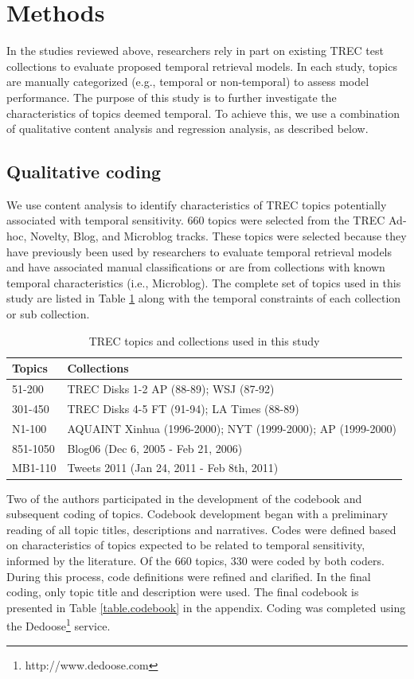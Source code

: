 \documentclass[runningheads,a4paper]{llncs}
\begin{document}
\section{Methods}

In the studies reviewed above, researchers rely in part on existing TREC test collections to evaluate proposed temporal retrieval models. In each study, topics are manually categorized (e.g.,  temporal or non-temporal) to assess model performance. The purpose of this study is to further investigate the characteristics of topics deemed temporal. To achieve this, we use a combination of qualitative content analysis and regression analysis, as described below.

\subsection{Qualitative coding}
We use content analysis \cite{Krippendorff1980} to identify characteristics of TREC topics potentially associated with temporal sensitivity. 660 topics were selected from the TREC Ad-hoc, Novelty, Blog, and Microblog tracks. These topics were selected because they have previously been used by researchers to evaluate temporal retrieval models and have associated manual classifications or are from collections with known temporal characteristics (i.e., Microblog). The complete set of topics used in this study are listed in Table \ref{table.topics} along with the temporal constraints of each collection or sub collection.

\begin{table}
\center
\small
\begin{tabular}{| l | l|} \hline
\bf{Topics} & \bf{Collections}\\ \hline
51-200 & TREC Disks 1-2 AP (88-89); WSJ (87-92) \\ \hline
301-450 &  TREC Disks 4-5 FT (91-94); LA Times (88-89) \\ \hline
N1-100 & AQUAINT Xinhua (1996-2000); NYT (1999-2000); AP (1999-2000) \\ \hline
851-1050 & Blog06  (Dec 6, 2005 - Feb 21, 2006) \\ \hline
MB1-110 & Tweets 2011 (Jan 24, 2011 - Feb 8th, 2011) \\ \hline
\end{tabular}
\caption{TREC topics and collections used in this study}
\label{table.topics}
\end{table}

Two of the authors participated in the development of the codebook and subsequent coding of topics. Codebook development began with a preliminary reading of all topic titles, descriptions and narratives. Codes were defined based on characteristics of topics expected to be related to temporal sensitivity, informed by the literature. Of the 660 topics, 330 were coded by both coders. During this process, code definitions were refined and clarified. In the final coding, only topic title and description were used. The final codebook is presented in Table \ref{table.codebook} in the appendix. Coding was completed using the Dedoose\footnote{http://www.dedoose.com} service.  
\end{document}
